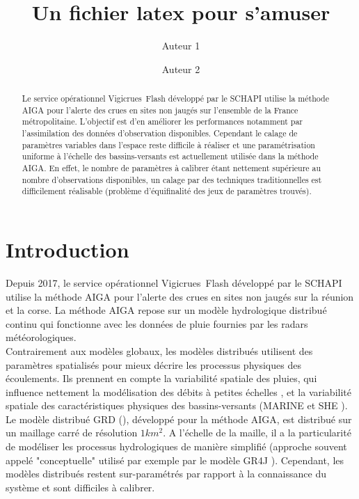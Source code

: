 \documentclass[a4paper,11pt]{article}
\title{Un fichier latex pour s'amuser}
\author[1]{Auteur 1}
\author[2]{Auteur 2}
\affil[1]{IRSTEA, unité de recherche en hydrologie RECOVER, 3275 route de Cézanne, Aix-en-Provence.}
\affil[2]{IRSTEA, unité de recherche GEAU, 361 rue J.F. Breton, 34196 Montpellier, France.}
\begin{document}
  

\maketitle


\begin{abstract}
Le service opérationnel Vigicrues Flash développé par le SCHAPI utilise la méthode AIGA pour l’alerte des crues en sites non jaugés sur l’ensemble de la France métropolitaine. L’objectif est d’en améliorer les performances notamment par l’assimilation des données d’observation disponibles.  Cependant le calage de paramètres variables dans l’espace reste difficile à réaliser et une paramétrisation uniforme à l’échelle des bassins-versants est actuellement utilisée dans la méthode AIGA. En effet, le nombre de paramètres à calibrer étant nettement supérieure au nombre d’observations disponibles, un calage par des techniques traditionnelles est difficilement réalisable (problème d’équifinalité des jeux de paramètres trouvés).\\
\end{abstract}


\section{Introduction}

Depuis 2017, le service opérationnel Vigicrues Flash développé par le SCHAPI utilise la méthode AIGA pour l’alerte des crues en sites non jaugés sur la réunion et la corse. La méthode AIGA repose sur un modèle hydrologique distribué continu qui fonctionne avec les données de pluie fournies par les radars météorologiques.\\
Contrairement aux modèles globaux, les modèles distribués utilisent des paramètres spatialisés pour mieux décrire les processus physiques des écoulements. Ils prennent en compte la variabilité spatiale des pluies, qui influence nettement la modélisation des débits à petites échelles \citep{merz2009regional}, et la variabilité spatiale des caractéristiques physiques des bassins-versants (MARINE \citep{estupina2006flash} et SHE \citep{abbott1986introduction}). Le modèle distribué GRD (\citep{javelle2014AIGA}), développé pour la méthode AIGA, est distribué sur un maillage carré de résolution $1km^2$. A l'échelle de la maille, il a la particularité de modéliser les processus hydrologiques de manière simplifié (approche souvent appelé "conceptuelle" utilisé par exemple par le modèle GR4J \citep{perrin2003improvement}). Cependant, les modèles distribués restent sur-paramétrés par rapport à la connaissance du système et sont difficiles à calibrer.\\
\end{document}

